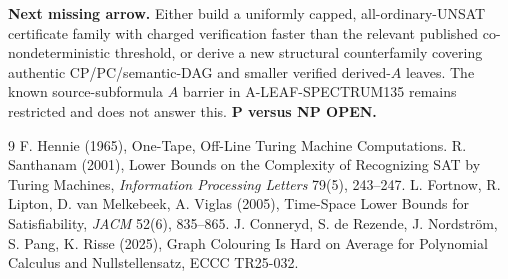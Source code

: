 \documentclass[11pt]{article}
\begin{document}
\textbf{Next missing arrow.} Either build a uniformly capped, all-ordinary-UNSAT certificate family with charged verification faster than the relevant published co-nondeterministic threshold, or derive a new structural counterfamily covering authentic CP/PC/semantic-DAG and smaller verified derived-$A$ leaves. The known source-subformula $A$ barrier in A-LEAF-SPECTRUM135 remains restricted and does not answer this. \textbf{P versus NP OPEN.}\par
\begin{thebibliography}{9}
 F. Hennie (1965), One-Tape, Off-Line Turing Machine Computations.
 R. Santhanam (2001), Lower Bounds on the Complexity of Recognizing SAT by Turing Machines, \emph{Information Processing Letters} 79(5), 243--247.
 L. Fortnow, R. Lipton, D. van Melkebeek, A. Viglas (2005), Time-Space Lower Bounds for Satisfiability, \emph{JACM} 52(6), 835--865.
 J. Conneryd, S. de Rezende, J. Nordstr\"om, S. Pang, K. Risse (2025), Graph Colouring Is Hard on Average for Polynomial Calculus and Nullstellensatz, ECCC TR25-032.
\end{thebibliography}
\end{document}
